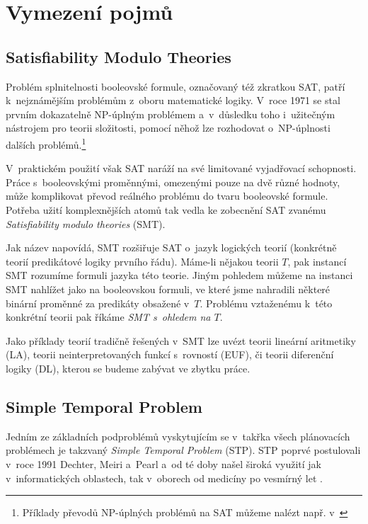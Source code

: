 \chapter{Vymezení pojmů}

\section{Satisfiability Modulo Theories}

Problém splnitelnosti booleovské formule, označovaný též zkratkou SAT, patří k~nejznámějším problémům z~oboru matematické logiky. V~roce 1971 se stal prvním dokazatelně NP-úplným problémem \cite{Cook71} a~v~důsledku toho i~užitečným nástrojem pro teorii složitosti, pomocí něhož lze rozhodovat o~NP-úplnosti dalších problémů.\footnote{Příklady převodů NP-úplných problémů na SAT můžeme nalézt např. v~\cite[kapitola 19]{Mares17}}

V~praktickém použití však SAT naráží na své limitované vyjadřovací schopnosti. Práce s~booleovskými proměnnými, omezenými pouze na dvě různé hodnoty, může komplikovat převod reálného problému do tvaru booleovské formule. Potřeba užití komplexnějších atomů tak vedla ke zobecnění SAT zvanému \emph{Satisfiability modulo theories} (SMT).

Jak název napovídá, SMT rozšiřuje SAT o~jazyk logických teorií (konkrétně teorií predikátové logiky prvního řádu). Máme-li nějakou teorii $T$, pak instancí SMT rozumíme formuli jazyka této teorie. Jiným pohledem můžeme na instanci SMT nahlížet jako na booleovskou formuli, ve které jsme nahradili některé binární proměnné za predikáty obsažené v~$T$. Problému vztaženému k~této konkrétní teorii pak říkáme \emph{SMT s~ohledem na $T$}.

Jako příklady teorií tradičně řešených v~SMT lze uvézt teorii lineární aritmetiky (LA), teorii neinterpretovaných funkcí s~rovností (EUF), či teorii diferenční logiky (DL), kterou se budeme zabývat ve zbytku práce.

\section{Simple Temporal Problem}\label{stp}

Jedním ze základních podproblémů vyskytujícím se v~takřka všech plánovacích problémech je takzvaný \emph{Simple Temporal Problem} (STP). STP poprvé postulovali v~roce 1991 Dechter, Meiri a~Pearl \cite{Dechter91} a~od té doby našel široká využití jak v~informatických oblastech, tak v~oborech od medicíny \cite{Anselma06} po vesmírný let \cite{Fukunaga97}.

